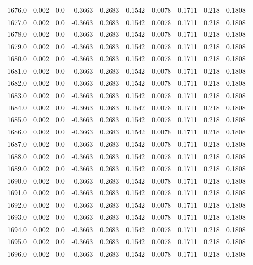 \begin{longtable}{lrrrrrrrrr}
1676.0 & 0.002 & 0.0 & -0.3663 & 0.2683 & 0.1542 & 0.0078 & 0.1711 & 0.218 & 0.1808 \\
1677.0 & 0.002 & 0.0 & -0.3663 & 0.2683 & 0.1542 & 0.0078 & 0.1711 & 0.218 & 0.1808 \\
1678.0 & 0.002 & 0.0 & -0.3663 & 0.2683 & 0.1542 & 0.0078 & 0.1711 & 0.218 & 0.1808 \\
1679.0 & 0.002 & 0.0 & -0.3663 & 0.2683 & 0.1542 & 0.0078 & 0.1711 & 0.218 & 0.1808 \\
1680.0 & 0.002 & 0.0 & -0.3663 & 0.2683 & 0.1542 & 0.0078 & 0.1711 & 0.218 & 0.1808 \\
1681.0 & 0.002 & 0.0 & -0.3663 & 0.2683 & 0.1542 & 0.0078 & 0.1711 & 0.218 & 0.1808 \\
1682.0 & 0.002 & 0.0 & -0.3663 & 0.2683 & 0.1542 & 0.0078 & 0.1711 & 0.218 & 0.1808 \\
1683.0 & 0.002 & 0.0 & -0.3663 & 0.2683 & 0.1542 & 0.0078 & 0.1711 & 0.218 & 0.1808 \\
1684.0 & 0.002 & 0.0 & -0.3663 & 0.2683 & 0.1542 & 0.0078 & 0.1711 & 0.218 & 0.1808 \\
1685.0 & 0.002 & 0.0 & -0.3663 & 0.2683 & 0.1542 & 0.0078 & 0.1711 & 0.218 & 0.1808 \\
1686.0 & 0.002 & 0.0 & -0.3663 & 0.2683 & 0.1542 & 0.0078 & 0.1711 & 0.218 & 0.1808 \\
1687.0 & 0.002 & 0.0 & -0.3663 & 0.2683 & 0.1542 & 0.0078 & 0.1711 & 0.218 & 0.1808 \\
1688.0 & 0.002 & 0.0 & -0.3663 & 0.2683 & 0.1542 & 0.0078 & 0.1711 & 0.218 & 0.1808 \\
1689.0 & 0.002 & 0.0 & -0.3663 & 0.2683 & 0.1542 & 0.0078 & 0.1711 & 0.218 & 0.1808 \\
1690.0 & 0.002 & 0.0 & -0.3663 & 0.2683 & 0.1542 & 0.0078 & 0.1711 & 0.218 & 0.1808 \\
1691.0 & 0.002 & 0.0 & -0.3663 & 0.2683 & 0.1542 & 0.0078 & 0.1711 & 0.218 & 0.1808 \\
1692.0 & 0.002 & 0.0 & -0.3663 & 0.2683 & 0.1542 & 0.0078 & 0.1711 & 0.218 & 0.1808 \\
1693.0 & 0.002 & 0.0 & -0.3663 & 0.2683 & 0.1542 & 0.0078 & 0.1711 & 0.218 & 0.1808 \\
1694.0 & 0.002 & 0.0 & -0.3663 & 0.2683 & 0.1542 & 0.0078 & 0.1711 & 0.218 & 0.1808 \\
1695.0 & 0.002 & 0.0 & -0.3663 & 0.2683 & 0.1542 & 0.0078 & 0.1711 & 0.218 & 0.1808 \\
1696.0 & 0.002 & 0.0 & -0.3663 & 0.2683 & 0.1542 & 0.0078 & 0.1711 & 0.218 & 0.1808 \\

\end{longtable}
